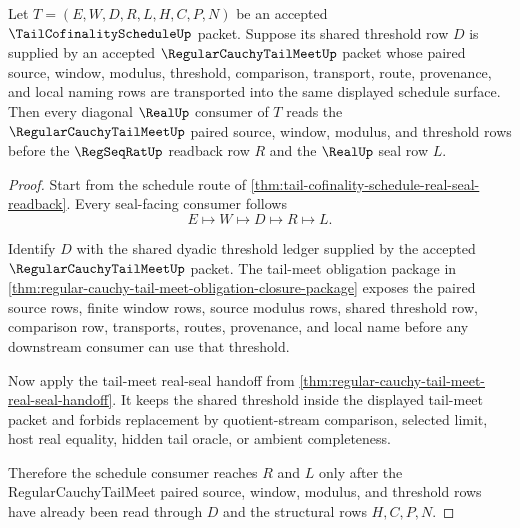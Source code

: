 \begin{theorem}
\label{thm:tail-cofinality-schedule-regular-cauchy-tail-meet-handoff}
Let $T=(E,W,D,R,L,H,C,P,N)$ be an accepted $\TailCofinalityScheduleUp$ packet. Suppose its shared threshold row $D$ is supplied by an accepted $\RegularCauchyTailMeetUp$ packet whose paired source, window, modulus, threshold, comparison, transport, route, provenance, and local naming rows are transported into the same displayed schedule surface. Then every diagonal $\RealUp$ consumer of $T$ reads the $\RegularCauchyTailMeetUp$ paired source, window, modulus, and threshold rows before the $\RegSeqRatUp$ readback row $R$ and the $\RealUp$ seal row $L$.
\end{theorem}
\begin{proof}
Start from the schedule route of \autoref{thm:tail-cofinality-schedule-real-seal-readback}. Every seal-facing consumer follows
$$
E \longmapsto W \longmapsto D \longmapsto R \longmapsto L.
$$

Identify $D$ with the shared dyadic threshold ledger supplied by the accepted $\RegularCauchyTailMeetUp$ packet. The tail-meet obligation package in \autoref{thm:regular-cauchy-tail-meet-obligation-closure-package} exposes the paired source rows, finite window rows, source modulus rows, shared threshold row, comparison row, transports, routes, provenance, and local name before any downstream consumer can use that threshold.

Now apply the tail-meet real-seal handoff from \autoref{thm:regular-cauchy-tail-meet-real-seal-handoff}. It keeps the shared threshold inside the displayed tail-meet packet and forbids replacement by quotient-stream comparison, selected limit, host real equality, hidden tail oracle, or ambient completeness.

Therefore the schedule consumer reaches $R$ and $L$ only after the RegularCauchyTailMeet paired source, window, modulus, and threshold rows have already been read through $D$ and the structural rows $H,C,P,N$.
\end{proof}


